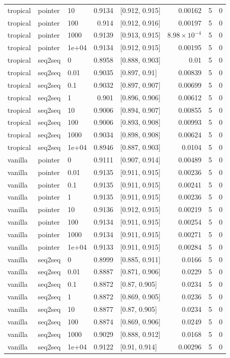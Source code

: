 \documentclass[10pt]{article}
\begin{document}
{\begin{longtable}{lllrlrrr}
tropical & pointer & 10 & 0.9134 & [0.912, 0.915] & 0.00162 & 5 & 0\\
tropical & pointer & 100 & 0.914 & [0.912, 0.916] & 0.00197 & 5 & 0\\
tropical & pointer & 1000 & 0.9139 & [0.913, 0.915] & $8.98\times10^{-4}$ & 5 & 0\\
tropical & pointer & 1e+04 & 0.9134 & [0.912, 0.915] & 0.00195 & 5 & 0\\
tropical & seq2seq & 0 & 0.8958 & [0.888, 0.903] & 0.01 & 5 & 0\\
tropical & seq2seq & 0.01 & 0.9035 & [0.897, 0.91] & 0.00839 & 5 & 0\\
tropical & seq2seq & 0.1 & 0.9032 & [0.897, 0.907] & 0.00699 & 5 & 0\\
tropical & seq2seq & 1 & 0.901 & [0.896, 0.906] & 0.00612 & 5 & 0\\
tropical & seq2seq & 10 & 0.9006 & [0.894, 0.907] & 0.00855 & 5 & 0\\
tropical & seq2seq & 100 & 0.9006 & [0.893, 0.908] & 0.00993 & 5 & 0\\
tropical & seq2seq & 1000 & 0.9034 & [0.898, 0.908] & 0.00624 & 5 & 0\\
tropical & seq2seq & 1e+04 & 0.8946 & [0.887, 0.903] & 0.0104 & 5 & 0\\
vanilla & pointer & 0 & 0.9111 & [0.907, 0.914] & 0.00489 & 5 & 0\\
vanilla & pointer & 0.01 & 0.9135 & [0.911, 0.915] & 0.00236 & 5 & 0\\
vanilla & pointer & 0.1 & 0.9135 & [0.911, 0.915] & 0.00241 & 5 & 0\\
vanilla & pointer & 1 & 0.9135 & [0.911, 0.915] & 0.00236 & 5 & 0\\
vanilla & pointer & 10 & 0.9136 & [0.912, 0.915] & 0.00219 & 5 & 0\\
vanilla & pointer & 100 & 0.9134 & [0.911, 0.915] & 0.00254 & 5 & 0\\
vanilla & pointer & 1000 & 0.9134 & [0.911, 0.915] & 0.00271 & 5 & 0\\
vanilla & pointer & 1e+04 & 0.9133 & [0.911, 0.915] & 0.00284 & 5 & 0\\
vanilla & seq2seq & 0 & 0.8999 & [0.885, 0.911] & 0.0166 & 5 & 0\\
vanilla & seq2seq & 0.01 & 0.8887 & [0.871, 0.906] & 0.0229 & 5 & 0\\
vanilla & seq2seq & 0.1 & 0.8872 & [0.87, 0.905] & 0.0234 & 5 & 0\\
vanilla & seq2seq & 1 & 0.8872 & [0.869, 0.905] & 0.0236 & 5 & 0\\
vanilla & seq2seq & 10 & 0.8877 & [0.87, 0.905] & 0.0234 & 5 & 0\\
vanilla & seq2seq & 100 & 0.8874 & [0.869, 0.906] & 0.0249 & 5 & 0\\
vanilla & seq2seq & 1000 & 0.9029 & [0.888, 0.912] & 0.0168 & 5 & 0\\
vanilla & seq2seq & 1e+04 & 0.9122 & [0.91, 0.914] & 0.00296 & 5 & 0\\
\bottomrule
\end{longtable}
}
\end{document}
